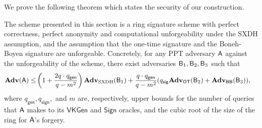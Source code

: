 We prove the following theorem which states the security of our construction.

\begin{theorem}\label{theo:security-sxdh}
The scheme presented in this section is a ring signature scheme
with perfect correctness, perfect anonymity and computational unforgeability under the
$\mathrm{SXDH}$ assumption, and the assumption
that the one-time signature and the Boneh-Boyen signature are unforgeable.
Concretely, for any PPT adversary $\mathsf{A}$ against the unforgeability of the scheme, there exist adversaries $\mathsf{B}_1,\mathsf{B}_2,\mathsf{B}_3$ such that
\begin{align*}
\mathbf{Adv}(\mathsf{A})\leq &\left(1+\frac{2q\cdot q_\mathsf{gen}}{q-m^2}\right)\mathbf{Adv}_{\mathrm{SXDH}}(\mathsf{B}_1)+\frac{q\cdot q_\mathsf{gen}}{q-m^2}(q_\mathsf{sig}\mathbf{Adv}_{\mathsf{OT}}(\mathsf{B}_2)+\mathbf{Adv}_{\mathsf{BB}}(\mathsf{B}_3)),
\end{align*}
where $q_\mathsf{gen},q_\mathsf{sign},$ and $m$ are, respectively, upper bounds for the number of queries that $\mathsf{A}$ makes to its $\mathsf{VKGen}$ and $\mathsf{Sign}$ oracles, and the cubic root of the size of the ring for $\mathsf{A}$'s forgery.
\end{theorem}
